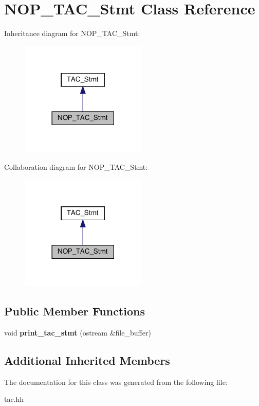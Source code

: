 \hypertarget{classNOP__TAC__Stmt}{}\section{N\+O\+P\+\_\+\+T\+A\+C\+\_\+\+Stmt Class Reference}
\label{classNOP__TAC__Stmt}


Inheritance diagram for N\+O\+P\+\_\+\+T\+A\+C\+\_\+\+Stmt\+:
\nopagebreak
\begin{figure}[H]
\begin{center}
\leavevmode
\includegraphics[width=170pt]{classNOP__TAC__Stmt__inherit__graph}
\end{center}
\end{figure}


Collaboration diagram for N\+O\+P\+\_\+\+T\+A\+C\+\_\+\+Stmt\+:
\nopagebreak
\begin{figure}[H]
\begin{center}
\leavevmode
\includegraphics[width=170pt]{classNOP__TAC__Stmt__coll__graph}
\end{center}
\end{figure}
\subsection*{Public Member Functions}
\begin{DoxyCompactItemize}
\item 
\mbox{\label{classNOP__TAC__Stmt_a12941d3f0b384ff5569af91ba5842cb0}} 
void {\bfseries print\+\_\+tac\+\_\+stmt} (ostream \&file\+\_\+buffer)
\end{DoxyCompactItemize}
\subsection*{Additional Inherited Members}


The documentation for this class was generated from the following file\+:\begin{DoxyCompactItemize}
\item 
tac.\+hh\end{DoxyCompactItemize}
